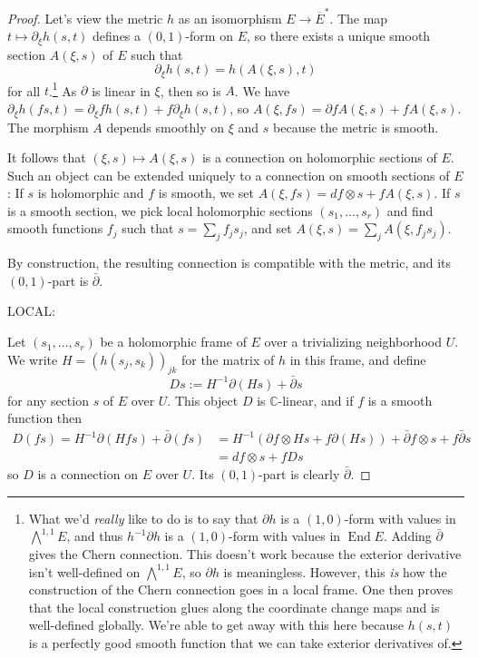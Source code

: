 \documentclass[11pt]{article}
\theoremstyle{definition}
\newcommand{\kk}[1]{\mathbb{#1}}
\DeclareMathOperator{\End}{End}
\begin{document}
\begin{proof}
Let's view the metric $h$ as an isomorphism $E \to \overline E^*$. The map $t \mapsto \partial_\xi h(s, t)$ defines a $(0,1)$-form on $E$, so there exists a unique smooth section $A(\xi,s)$ of $E$ such that
$$
\partial_\xi h(s, t) = h(A(\xi, s), t)
$$
for all $t$.\footnote{What we'd \emph{really} like to do is to say that $\partial h$ is a $(1,0)$-form with values in $\bigwedge^{1,1}E$, and thus $h^{-1}\partial h$ is a $(1,0)$-form with values in $\End E$. Adding $\bar\partial$ gives the Chern connection. This doesn't work because the exterior derivative isn't well-defined on $\bigwedge^{1,1}E$, so $\partial h$ is meaningless. However, this \emph{is} how the construction of the Chern connection goes in a local frame. One then proves that the local construction glues along the coordinate change maps and is well-defined globally. We're able to get away with this here because $h(s,t)$ is a perfectly good smooth function that we can take exterior derivatives of.}
As $\partial$ is linear in $\xi$, then so is $A$. We have $\partial_\xi h(f s, t) = \partial_\xi f h(s,t) + f \partial_\xi h(s, t)$, so $A(\xi, fs) = \partial f A(\xi, s) + f A(\xi, s)$. The morphism $A$ depends smoothly on $\xi$ and $s$ because the metric is smooth.

It follows that $(\xi, s) \mapsto A(\xi, s)$ is a connection on holomorphic sections of $E$. Such an object can be extended uniquely to a connection on smooth sections of $E$: If $s$ is holomorphic and $f$ is smooth, we set $A(\xi, f s) = df \otimes s + f A(\xi, s)$. If $s$ is a smooth section, we pick local holomorphic sections $(s_1, \ldots, s_r)$ and find smooth functions $f_j$ such that $s = \sum_j f_j s_j$, and set $A(\xi,s) = \sum_j A(\xi, f_j s_j)$.

By construction, the resulting connection is compatible with the metric, and its $(0,1)$-part is $\bar\partial$.


LOCAL:

Let $(s_1, \ldots, s_r)$ be a holomorphic frame of $E$ over a trivializing neighborhood $U$. We write $H = (h(s_j, s_k))_{jk}$ for the matrix of $h$ in this frame, and define
$$
D s := H^{-1}\partial (H s) + \bar\partial s
$$
for any section $s$ of $E$ over $U$. This object $D$ is $\kk C$-linear, and if $f$ is a smooth function then
\begin{align*}
D(fs)
= H^{-1}\partial (H fs) + \bar\partial (fs)
&= H^{-1}(\partial f \otimes Hs + f\partial( H s)) + \bar\partial f \otimes s + f \bar\partial s
\\
&= df \otimes s + f Ds
\end{align*}
so $D$ is a connection on $E$ over $U$. Its $(0,1)$-part is clearly $\bar\partial$.


\end{proof}
\end{document}
